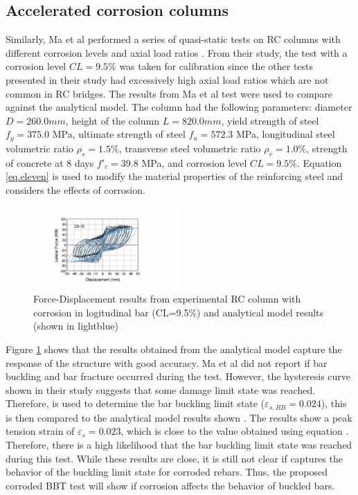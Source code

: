 \subsection{Accelerated corrosion columns}
Similarly, Ma et al performed a series of quasi-static tests on RC columns with different corrosion levels and axial load ratios \cite{Ma2012}. From their study, the test with a corrosion level $CL=9.5\%$ was taken for calibration since the other tests presented in their study had excessively high axial load ratios which are not common in RC bridges. The results from Ma et al test	\cite{Ma2012} were used to compare against the analytical model. The column had the following parameters: diameter $D = 260.0 mm$, height of the column $L = 820.0 mm$, yield strength of steel $f_{y} = 375.0$ MPa, ultimate strength of steel $f_{u} = 572.3$ MPa, longitudinal steel volumetric ratio $\rho_{s} = 1.5\% $, transverse steel volumetric ratio $\rho_{v} = 1.0\% $, strength of concrete at 8 days $f'_{c} = 39.8$ MPa, and corrosion level $CL=9.5\%$. Equation \ref{eq.eleven} is used to modify the material properties of the reinforcing steel and considers the effects of corrosion. 

\begin{figure}[htbp]
	\centering
	\includegraphics[width=0.50\textwidth]{Chapter-5/figs/Model_vs_MaEtAl_220218.pdf}
	\caption{Force-Displacement results from experimental RC column with corrosion in logitudinal bar (CL=9.5\%) \cite{Ma2012} and analytical model results (shown in lightblue)}
	\label{fig:ModelCalibration_Corrosion}
\end{figure}

Figure \ref{fig:ModelCalibration_Corrosion} shows that the results obtained from the analytical model capture the response of the structure with good accuracy. Ma et al \cite{Ma2012} did not report if bar buckling and bar fracture occurred during the test. However, the hysteresis curve shown in their study suggests that some damage limit state was reached. Therefore,  is used to determine the bar buckling limit state ($\varepsilon_{s,BB}=0.024$), this is then compared to the analytical model results shown . The results show a peak tension strain of $\varepsilon_{s}=0.023$, which is close to the value obtained using equation . Therefore, there is a high likelihood that the bar buckling limit state was reached during this test. While these results are close, it is still not clear if  captures the behavior of the buckling limit state for corroded rebars. Thus, the proposed corroded BBT test will show if corrosion affects the behavior of buckled bars.

